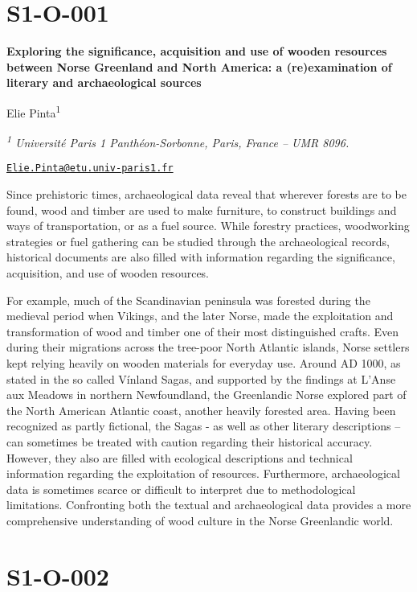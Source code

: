 \documentclass[
]{book}
\begin{document}
\hypertarget{s1-o-001}{%
\section*{S1-O-001}\label{s1-o-001}}

\textbf{Exploring the significance, acquisition and use of wooden resources between Norse Greenland and North America: a (re)examination of literary and archaeological sources}

Elie Pinta\textsuperscript{1}

\emph{\textsuperscript{1} Université Paris 1 Panthéon-Sorbonne, Paris, France -- UMR 8096.}

\href{mailto:Elie.Pinta@etu.univ-paris1.fr}{\nolinkurl{Elie.Pinta@etu.univ-paris1.fr}}

Since prehistoric times, archaeological data reveal that wherever forests are to be found, wood and timber are used to make furniture, to construct buildings and ways of transportation, or as a fuel source. While forestry practices, woodworking strategies or fuel gathering can be studied through the archaeological records, historical documents are also filled with information regarding the significance, acquisition, and use of wooden resources.

For example, much of the Scandinavian peninsula was forested during the medieval period when Vikings, and the later Norse, made the exploitation and transformation of wood and timber one of their most distinguished crafts. Even during their migrations across the tree-poor North Atlantic islands, Norse settlers kept relying heavily on wooden materials for everyday use. Around AD 1000, as stated in the so called Vínland Sagas, and supported by the findings at L'Anse aux Meadows in northern Newfoundland, the Greenlandic Norse explored part of the North American Atlantic coast, another heavily forested area. Having been recognized as partly fictional, the Sagas - as well as other literary descriptions -- can sometimes be treated with caution regarding their historical accuracy. However, they also are filled with ecological descriptions and technical information regarding the exploitation of resources. Furthermore, archaeological data is sometimes scarce or difficult to interpret due to methodological limitations. Confronting both the textual and archaeological data provides a more comprehensive understanding of wood culture in the Norse Greenlandic world.

\hypertarget{s1-o-002}{%
\section*{S1-O-002}\label{s1-o-002}}
\end{document}
